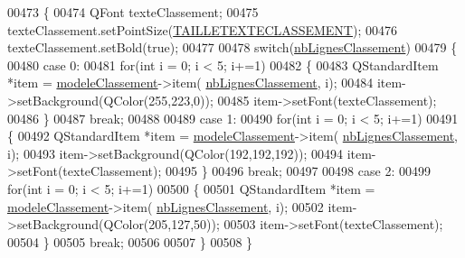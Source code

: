 \begin{DoxyCode}
00473 \{
00474     QFont texteClassement;
00475     texteClassement.setPointSize(\hyperlink{ihmchronocross_8h_ad9c2b9995bc14e73ab20cdd74252126d}{TAILLETEXTECLASSEMENT});
00476     texteClassement.setBold(\textcolor{keyword}{true});
00477 
00478     \textcolor{keywordflow}{switch}(\hyperlink{class_i_h_m_chrono_cross_a86ed3469ca99988211bcf0970527c119}{nbLignesClassement})
00479     \{
00480         \textcolor{keywordflow}{case} 0:
00481             \textcolor{keywordflow}{for}(\textcolor{keywordtype}{int} i = 0; i < 5; i+=1)
00482             \{
00483                 QStandardItem *item = \hyperlink{class_i_h_m_chrono_cross_ac25c95280801f36c43a1c41cf2fa253e}{modeleClassement}->item(
      \hyperlink{class_i_h_m_chrono_cross_a86ed3469ca99988211bcf0970527c119}{nbLignesClassement}, i);
00484                 item->setBackground(QColor(255,223,0));
00485                 item->setFont(texteClassement);
00486             \}
00487         \textcolor{keywordflow}{break};
00488 
00489         \textcolor{keywordflow}{case} 1:
00490             \textcolor{keywordflow}{for}(\textcolor{keywordtype}{int} i = 0; i < 5; i+=1)
00491             \{
00492                 QStandardItem *item = \hyperlink{class_i_h_m_chrono_cross_ac25c95280801f36c43a1c41cf2fa253e}{modeleClassement}->item(
      \hyperlink{class_i_h_m_chrono_cross_a86ed3469ca99988211bcf0970527c119}{nbLignesClassement}, i);
00493                 item->setBackground(QColor(192,192,192));
00494                 item->setFont(texteClassement);
00495             \}
00496         \textcolor{keywordflow}{break};
00497 
00498         \textcolor{keywordflow}{case} 2:
00499             \textcolor{keywordflow}{for}(\textcolor{keywordtype}{int} i = 0; i < 5; i+=1)
00500             \{
00501                 QStandardItem *item = \hyperlink{class_i_h_m_chrono_cross_ac25c95280801f36c43a1c41cf2fa253e}{modeleClassement}->item(
      \hyperlink{class_i_h_m_chrono_cross_a86ed3469ca99988211bcf0970527c119}{nbLignesClassement}, i);
00502                 item->setBackground(QColor(205,127,50));
00503                 item->setFont(texteClassement);
00504             \}
00505         \textcolor{keywordflow}{break};
00506 
00507     \}
00508 \}
\end{DoxyCode}
\mbox{\label{class_i_h_m_chrono_cross_a4926e7524f4fd76ccceb0aef5ebcb203}} 
